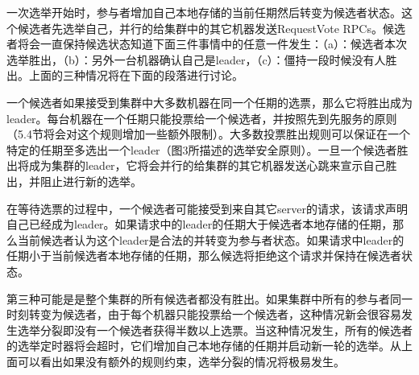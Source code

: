 \documentclass[journal]{IEEEtran}
\begin{document}
一次选举开始时，参与者增加自己本地存储的当前任期然后转变为候选者状态。这个候选者先选举自己，并行的给集群中的其它机器发送RequestVote RPCs。候选者将会一直保持候选状态知道下面三件事情中的任意一件发生：（a）：候选者本次选举胜出，（b）：另外一台机器确认自己是leader，（c）：僵持一段时候没有人胜出。上面的三种情况将在下面的段落进行讨论。


一个候选者如果接受到集群中大多数机器在同一个任期的选票，那么它将胜出成为leader。每台机器在一个任期只能投票给一个候选者，并按照先到先服务的原则（5.4节将会对这个规则增加一些额外限制）。大多数投票胜出规则可以保证在一个特定的任期至多选出一个leader（图3所描述的选举安全原则）。一旦一个候选者胜出将成为集群的leader，它将会并行的给集群的其它机器发送心跳来宣示自己胜出，并阻止进行新的选举。


在等待选票的过程中，一个候选者可能接受到来自其它server的请求，该请求声明自己已经成为leader。如果请求中的leader的任期大于候选者本地存储的任期，那么当前候选者认为这个leader是合法的并转变为参与者状态。如果请求中leader的任期小于当前候选者本地存储的任期，那么候选将拒绝这个请求并保持在候选者状态。


第三种可能是是整个集群的所有候选者都没有胜出。如果集群中所有的参与者同一时刻转变为候选者，由于每个机器只能投票给一个候选者，这种情况新会很容易发生选举分裂即没有一个候选者获得半数以上选票。当这种情况发生，所有的候选者的选举定时器将会超时，它们增加自己本地存储的任期并启动新一轮的选举。从上面可以看出如果没有额外的规则约束，选举分裂的情况将极易发生。
\end{document}

